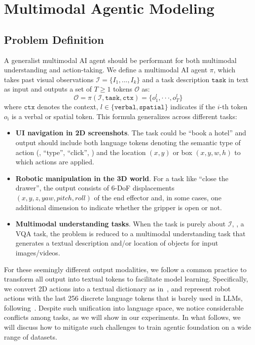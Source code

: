 \section{Multimodal Agentic Modeling}
\label{sec:formatting}

\subsection{Problem Definition}

A generalist multimodal AI agent should be performant for both multimodal understanding and action-taking. We define a multimodal AI agent ${\pi}$, which takes past visual observations $\mathcal{I} = \{I_1,...,I_k\}$ and a task description $\texttt{task}$ in text as input and outputs a set of $T\geq 1$ tokens $\mathcal{O}$ as:
\begin{equation}
    \mathcal{O} = \mathcal{\pi}(\mathcal{I}, \texttt{task}, \texttt{ctx}) = \{o^{l}_{1},\cdot\cdot\cdot,o^{l}_{T}\}
    \label{equ1:original target}
\end{equation}
where $\texttt{ctx}$ denotes the context, $l \in \{\texttt{verbal}, \texttt{spatial}\}$ indicates if the $i$-th token $o_i$ is a verbal or spatial token. This formula generalizes across different tasks:
\begin{itemize}
    \item \textbf{UI navigation in 2D screenshots}. The task could be ``book a hotel'' and output should include both language tokens denoting the semantic type of action (\eg, ``type'', ``click'', \etc) and the location $(x,y)$ or box $(x,y,w,h)$ to which actions are applied.
    \item \textbf{Robotic manipulation in the 3D world}. For a task like ``close the drawer'', the output consists of 6-DoF displacements $(x,y,z,yaw,pitch,roll)$ of the end effector and, in some cases, one additional dimension to indicate whether the gripper is open or not.
    \item \textbf{Multimodal understanding tasks}. When the task is purely about $\mathcal{I}$, \eg, a VQA task, the problem is reduced to a multimodal understanding task that generates a textual description and/or location of objects for input images/videos.
\end{itemize}

For these seemingly different output modalities, we follow a common practice to transform all output into textual tokens to facilitate model learning. Specifically, we convert 2D actions into a textual dictionary as in~\cite{seeclick}, and represent robot actions with the last 256 discrete language tokens that is barely used in LLMs, following~\cite{kim2024openvla}. Despite such unification into language space, we notice considerable conflicts among tasks, as we will show in our experiments. In what follows, we will discuss how to mitigate such challenges to train agentic foundation on a wide range of datasets.


